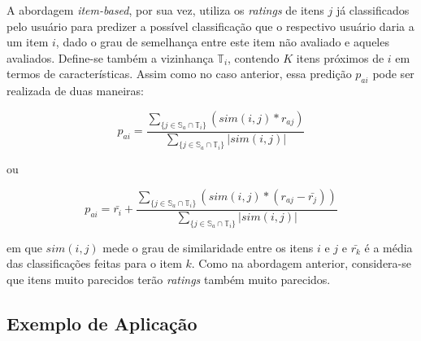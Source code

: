 \vspace{12pt}

A abordagem \textit{item-based}, por sua vez, utiliza os \textit{ratings} de
itens \(j\) já classificados pelo usuário para predizer a possível classificação
que o respectivo usuário daria a um item \(i\), dado o grau de semelhança entre este
item não avaliado e aqueles avaliados. Define-se também a vizinhança
\(\mathbb{T}_i\), contendo \(K\) itens próximos de \(i\) em termos de
características. Assim como no caso anterior, essa predição \(p_{ai}\) pode ser
realizada de duas maneiras:


\begin{equation}
p_{ai} = \frac{\sum_{\{ j\in \mathbb{S}_a \cap \mathbb{T}_i \}} \left(
sim(i,j) * r_{aj} \right)}{\sum_{\{ j\in \mathbb{S}_a \cap \mathbb{T}_i \}}
\left| sim(i,j)\right|}
\end{equation}

ou

\begin{equation}
p_{ai} = \bar{r_i} + \frac{\sum_{\{ j\in \mathbb{S}_a \cap \mathbb{T}_i \}}
\left( sim(i,j) * (r_{aj} - \bar{r_j})\right)}{\sum_{\{ j\in \mathbb{S}_a \cap
\mathbb{T}_i \}} \left| sim(i,j)\right|}
\end{equation}

em que \(sim(i,j)\) mede o grau de similaridade entre os itens \(i\) e \(j\) e
\(\bar{r_k}\) é a média das classificações feitas para o item \(k\). Como na
abordagem anterior, considera-se que itens muito parecidos terão
\textit{ratings} também muito parecidos.

\subsection{Exemplo de Aplicação}

